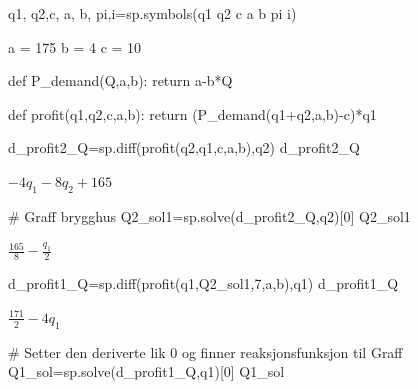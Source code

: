 \documentclass[
  12pt,
  a4paper,
  DIV=11,
  numbers=noendperiod]{scrartcl}
\newenvironment{Shaded}{\begin{snugshade}}{\end{snugshade}}
\newcommand{\CommentTok}[1]{\textcolor[rgb]{0.37,0.37,0.37}{#1}}
\newcommand{\ControlFlowTok}[1]{\textcolor[rgb]{0.00,0.23,0.31}{#1}}
\newcommand{\DecValTok}[1]{\textcolor[rgb]{0.68,0.00,0.00}{#1}}
\newcommand{\KeywordTok}[1]{\textcolor[rgb]{0.00,0.23,0.31}{#1}}
\newcommand{\NormalTok}[1]{\textcolor[rgb]{0.00,0.23,0.31}{#1}}
\newcommand{\OperatorTok}[1]{\textcolor[rgb]{0.37,0.37,0.37}{#1}}
\newcommand{\StringTok}[1]{\textcolor[rgb]{0.13,0.47,0.30}{#1}}
\begin{document}
\begin{Shaded}
\begin{Highlighting}[]
\NormalTok{q1, q2,c, a, b, pi,i}\OperatorTok{=}\NormalTok{sp.symbols(}\StringTok{\textquotesingle{}q1 q2 c a b pi i\textquotesingle{}}\NormalTok{)}

\NormalTok{a }\OperatorTok{=} \DecValTok{175}
\NormalTok{b }\OperatorTok{=} \DecValTok{4}
\NormalTok{c }\OperatorTok{=} \DecValTok{10}


\KeywordTok{def}\NormalTok{ P\_demand(Q,a,b):}
    \ControlFlowTok{return}\NormalTok{ a}\OperatorTok{{-}}\NormalTok{b}\OperatorTok{*}\NormalTok{Q}

\KeywordTok{def}\NormalTok{ profit(q1,q2,c,a,b):}
    \ControlFlowTok{return}\NormalTok{ (P\_demand(q1}\OperatorTok{+}\NormalTok{q2,a,b)}\OperatorTok{{-}}\NormalTok{c)}\OperatorTok{*}\NormalTok{q1}
\end{Highlighting}
\end{Shaded}

\begin{Shaded}
\begin{Highlighting}[]
\NormalTok{d\_profit2\_Q}\OperatorTok{=}\NormalTok{sp.diff(profit(q2,q1,c,a,b),q2)}
\NormalTok{d\_profit2\_Q}
\end{Highlighting}
\end{Shaded}

$\displaystyle - 4 q_{1} - 8 q_{2} + 165$

\begin{Shaded}
\begin{Highlighting}[]
\CommentTok{\# Graff brygghus}
\NormalTok{Q2\_sol1}\OperatorTok{=}\NormalTok{sp.solve(d\_profit2\_Q,q2)[}\DecValTok{0}\NormalTok{]}
\NormalTok{Q2\_sol1}
\end{Highlighting}
\end{Shaded}

$\displaystyle \frac{165}{8} - \frac{q_{1}}{2}$

\begin{Shaded}
\begin{Highlighting}[]
\NormalTok{d\_profit1\_Q}\OperatorTok{=}\NormalTok{sp.diff(profit(q1,Q2\_sol1,}\DecValTok{7}\NormalTok{,a,b),q1)}
\NormalTok{d\_profit1\_Q}
\end{Highlighting}
\end{Shaded}

$\displaystyle \frac{171}{2} - 4 q_{1}$

\begin{Shaded}
\begin{Highlighting}[]
\CommentTok{\# Setter den deriverte lik 0 og finner reaksjonsfunksjon til Graff}
\NormalTok{Q1\_sol}\OperatorTok{=}\NormalTok{sp.solve(d\_profit1\_Q,q1)[}\DecValTok{0}\NormalTok{]}
\NormalTok{Q1\_sol}
\end{Highlighting}
\end{Shaded}
\end{document}
